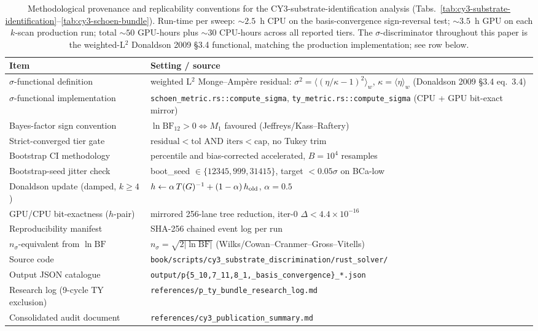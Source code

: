 \begin{table}[t]
\centering
\caption{Methodological provenance and replicability conventions for the CY3-substrate-identification analysis (Tabs.~\ref{tab:cy3-substrate-identification}--\ref{tab:cy3-schoen-bundle}). Run-time per sweep: $\sim 2.5$~h CPU on the basis-convergence sign-reversal test; $\sim 3.5$~h GPU on each $k$-scan production run; total ${\sim}50$ GPU-hours plus ${\sim}30$ CPU-hours across all reported tiers. The $\sigma$-discriminator throughout this paper is the weighted-L$^2$ Donaldson 2009 §3.4 functional, matching the production implementation; see row below.}
\label{tab:cy3-methodology}
\begin{ruledtabular}
\begin{tabular}{ll}
Item & Setting / source \\
\hline
$\sigma$-functional definition & weighted L$^2$ Monge--Ampère residual: $\sigma^2 = \langle (\eta/\kappa - 1)^2 \rangle_{w}$, $\kappa = \langle \eta \rangle_{w}$ (Donaldson 2009 §3.4 eq.~3.4) \\
$\sigma$-functional implementation & \texttt{schoen\_metric.rs::compute\_sigma}, \texttt{ty\_metric.rs::compute\_sigma} (CPU + GPU bit-exact mirror) \\
Bayes-factor sign convention & $\ln \mathrm{BF}_{12} > 0 \Leftrightarrow M_1$ favoured (Jeffreys/Kass--Raftery) \\
Strict-converged tier gate & $\mathrm{residual} < \mathrm{tol}$ AND $\mathrm{iters} < \mathrm{cap}$, no Tukey trim \\
Bootstrap CI methodology & percentile and bias-corrected accelerated, $B=10^4$ resamples \\
Bootstrap-seed jitter check & boot\_seed $\in \{12345, 999, 31415\}$, target $<0.05\sigma$ on BCa-low \\
Donaldson update (damped, $k\ge 4$) & $h \leftarrow \alpha\,T(G)^{-1} + (1-\alpha)\,h_{\rm old}$, $\alpha = 0.5$ \\
GPU/CPU bit-exactness ($h$-pair) & mirrored 256-lane tree reduction, iter-0 $\Delta < 4.4\times 10^{-16}$ \\
Reproducibility manifest & SHA-256 chained event log per run \\
$n_\sigma$-equivalent from $\ln \mathrm{BF}$ & $n_\sigma = \sqrt{2|\ln \mathrm{BF}|}$ (Wilks/Cowan--Cranmer--Gross--Vitells) \\
Source code & \texttt{book/scripts/cy3\_substrate\_discrimination/rust\_solver/} \\
Output JSON catalogue & \texttt{output/p\{5\_10,7\_11,8\_1,\_basis\_convergence\}\_*.json} \\
Research log (9-cycle TY exclusion) & \texttt{references/p\_ty\_bundle\_research\_log.md} \\
Consolidated audit document & \texttt{references/cy3\_publication\_summary.md} \\
\end{tabular}
\end{ruledtabular}
\end{table}
